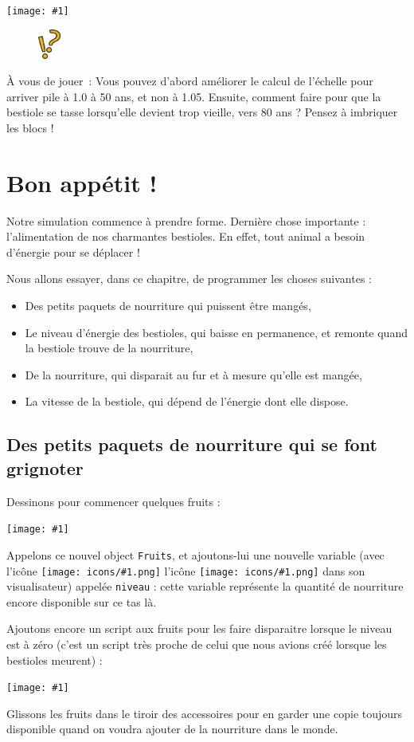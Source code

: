 \documentclass[a4paper,12pt]{book}
\newcommand{\capture}[1]
{
\begin{center}
	\texttt{[image: \#1]}
\end{center}
}
\newcommand{\brique}[1]{
\sffamily
\fcolorbox[RGB]{200,192,144}{200,248,200}{\textbf{#1}}
\normalfont
}
\newcommand{\code}[1]{\texttt{#1}}
\newcommand{\important}[1]{\textbf{#1}}
\newcommand{\inserticon}[1]
{
\texttt{[image: icons/\#1.png]}
}
\newcommand{\icon}[2][]
{
\ifthenelse {\equal{#1} {}} {\inserticon{#2}} {l'icône \inserticon{#2} \important{#1}}
}
\newcommand{\astuce}[1]
{
\begin{framed}
\begin{figure}
	\vspace{-15pt}
	\includegraphics[width=2.0em]{astuce.png}
\end{figure}
#1
\end{framed}
}
\let\myMargin\marginpar
\renewcommand{\marginpar}[1]{\myMargin{{\scriptsize \sffamily #1}}}
\begin{document}
\capture{52.png}

\astuce{À vous de jouer~: Vous pouvez d'abord améliorer le calcul de l'échelle
pour arriver pile à 1.0 à 50 ans, et non à 1.05. Ensuite, comment faire pour
que la bestiole se \og tasse \fg lorsqu'elle devient trop vieille, vers 80 ans
? Pensez à imbriquer les blocs \brique{Si Oui Non} !}

\section{Bon appétit !}

Notre simulation commence à prendre forme. Dernière chose importante :
l'alimentation de nos charmantes bestioles. En effet, tout animal a besoin d'énergie pour se déplacer !

Nous allons essayer, dans ce chapitre, de programmer les choses suivantes :
\begin{itemize}
	\item Des petits paquets de nourriture qui puissent être mangés,
	\item Le niveau d'énergie des bestioles, qui baisse en permanence, et remonte quand la bestiole trouve de la nourriture,
	\item De la nourriture, qui disparait au fur et à mesure qu'elle est mangée,
	\item La vitesse de la bestiole, qui dépend de l'énergie dont elle dispose.
\end{itemize}

\subsection{Des petits paquets de nourriture qui se font grignoter}

Dessinons pour commencer quelques fruits :

\capture{53.png}

Appelons ce nouvel object \code{Fruits}, et ajoutons-lui une nouvelle variable
(avec l'icône \icon{variable} dans son visualisateur) appelée \code{niveau} :
cette variable représente la quantité de nourriture encore disponible sur ce
tas là.

Ajoutons encore un script aux fruits pour les faire disparaitre lorsque le
niveau est à zéro (c'est un script très proche de celui que nous avions créé
lorsque les bestioles meurent) :

\capture{54.png}

Glissons les fruits dans le tiroir des accessoires pour en garder une copie toujours disponible quand on voudra ajouter de la nourriture dans le monde.
\end{document}
